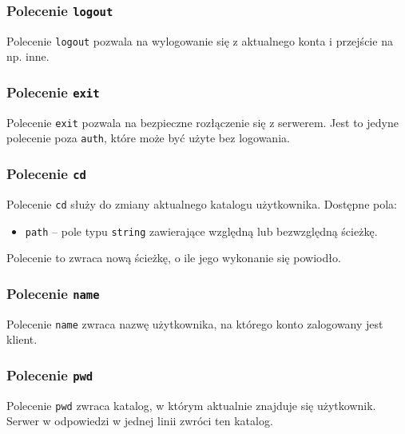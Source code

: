 \documentclass[10pt,a4paper]{article}
\begin{document}
\subsubsection{Polecenie \texttt{logout}}
Polecenie \texttt{logout} pozwala na wylogowanie się z aktualnego konta i przejście na np. inne.

\subsubsection{Polecenie \texttt{exit}}
Polecenie \texttt{exit} pozwala na bezpieczne rozłączenie się z serwerem. Jest to jedyne polecenie poza \texttt{auth}, które może być użyte bez logowania.

\subsubsection{Polecenie \texttt{cd}}
Polecenie \texttt{cd} służy do zmiany aktualnego katalogu użytkownika. Dostępne pola:
\begin{itemize}
    \item \texttt{path} -- pole typu \texttt{string} zawierające względną lub bezwzględną ścieżkę.
\end{itemize}
Polecenie to zwraca nową ścieżkę, o ile jego wykonanie się powiodło.

\subsubsection{Polecenie \texttt{name}}
Polecenie \texttt{name} zwraca nazwę użytkownika, na którego konto zalogowany jest klient.

\subsubsection{Polecenie \texttt{pwd}}
Polecenie \texttt{pwd} zwraca katalog, w którym aktualnie znajduje się użytkownik. Serwer w odpowiedzi w jednej linii zwróci ten katalog.
\end{document}
